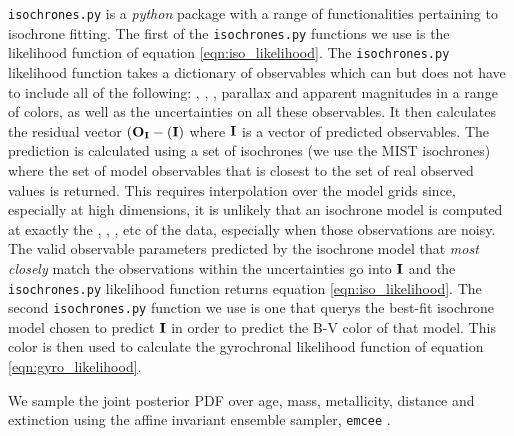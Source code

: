 {\tt isochrones.py} is a {\it python} package with a range of functionalities
pertaining to isochrone fitting.
The first of the {\tt isochrones.py} functions we use is the likelihood
function of equation \ref{eqn:iso_likelihood}.
The {\tt isochrones.py} likelihood function takes a dictionary of observables
which can but does not have to include all of the following: \teff, \logg,
\feh, parallax and apparent magnitudes in a range of colors, as well as the
uncertainties on all these observables.
It then calculates the residual vector $({\bf O_I} - ({\bf I})$ where ${\bf
I}$ is a vector of predicted observables.
The prediction is calculated using a set of isochrones (we use the MIST
isochrones) where the set of model observables that is closest to the set of
real observed values is returned.
This requires interpolation over the model grids since, especially at high
dimensions, it is unlikely that an isochrone model is computed at exactly the
\teff, \logg, \feh, etc of the data, especially when those observations are
noisy.
The valid observable parameters predicted by the isochrone model that {\it
most closely} match the observations within the uncertainties go into ${\bf
I}$ and the {\tt isochrones.py} likelihood function returns equation
\ref{eqn:iso_likelihood}.
The second {\tt isochrones.py} function we use is one that querys the best-fit
isochrone model chosen to predict ${\bf I}$ in order to predict the B-V color
of that model.
This color is then used to calculate the gyrochronal likelihood function of
equation \ref{eqn:gyro_likelihood}.


We sample the joint posterior PDF over age, mass, metallicity, distance and
extinction using the affine invariant ensemble sampler, {\tt emcee}
\citep{foreman-mackey2013}.


